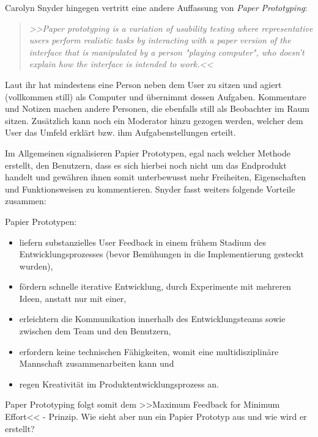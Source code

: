 Carolyn Snyder hingegen vertritt eine andere Auffassung von \emph{Paper Prototyping}: 
\newpage
\begin{quote}
	\textsl{>>Paper prototyping is a variation of usability testing where representative users perform realistic tasks by interacting with a paper version of the interface that is manipulated by a person "playing computer", who doesn't explain how the interface is intended to work.<<}
\begin{flushright}\citep{Snyder:2003}\end{flushright}
\end{quote}

Laut ihr hat mindestens eine Person neben dem User zu sitzen und agiert (vollkommen still) als Computer und übernimmt dessen Aufgaben. Kommentare und Notizen machen andere Personen, die ebenfalls still als Beobachter im Raum sitzen. Zusätzlich kann noch ein Moderator hinzu gezogen werden, welcher dem User das Umfeld erklärt bzw. ihm Aufgabenstellungen erteilt.

\medskip Im Allgemeinen signalisieren Papier Prototypen, egal nach welcher Methode erstellt, den Benutzern, dass es sich hierbei noch nicht um das Endprodukt handelt und gewähren ihnen somit unterbewusst mehr Freiheiten, Eigenschaften und Funktionsweisen zu kommentieren. Snyder fasst weiters folgende Vorteile zusammen:

\medskip Papier Prototypen:
\begin{itemize}
	\item liefern substanzielles User Feedback in einem frühem Stadium des Entwicklungsprozesses (bevor Bemühungen in die Implementierung gesteckt wurden),
	\item fördern schnelle iterative Entwicklung, durch Experimente mit mehreren Ideen, anstatt nur mit einer,
	\item erleichtern die Kommunikation innerhalb des Entwicklungsteams sowie zwischen dem Team und den Benutzern,
	\item erfordern keine technischen Fähigkeiten, womit eine multidisziplinäre Mannschaft zusammenarbeiten kann und
	\item regen Kreativität im Produktentwicklungsprozess an.
\end{itemize}
\begin{flushright}\citep{Snyder:2003}\end{flushright}
	
Paper Prototyping folgt somit dem >>Maximum Feedback for Minimum Effort<< - Prinzip. Wie sieht aber nun ein Papier Prototyp aus und wie wird er erstellt?

